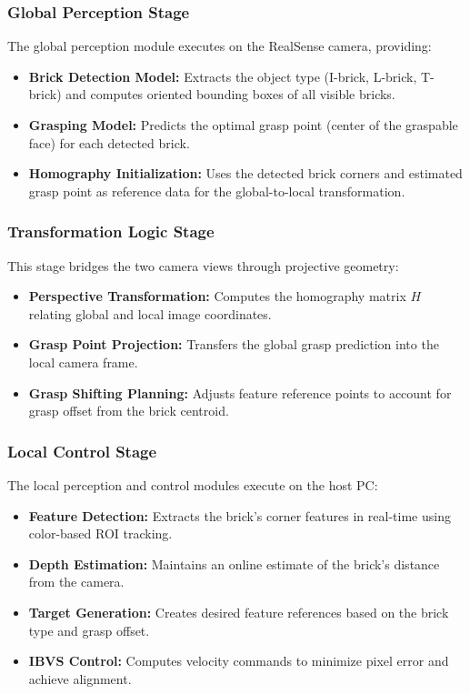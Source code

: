 \subsubsection{Global Perception Stage}
The global perception module executes on the RealSense camera, providing:
\begin{itemize}
    \item \textbf{Brick Detection Model:} Extracts the object type (I-brick, L-brick, T-brick) and computes oriented bounding boxes of all visible bricks.
    \item \textbf{Grasping Model:} Predicts the optimal grasp point (center of the graspable face) for each detected brick.
    \item \textbf{Homography Initialization:} Uses the detected brick corners and estimated grasp point as reference data for the global-to-local transformation.
\end{itemize}

\subsubsection{Transformation Logic Stage}
This stage bridges the two camera views through projective geometry:
\begin{itemize}
    \item \textbf{Perspective Transformation:} Computes the homography matrix $H$ relating global and local image coordinates.
    \item \textbf{Grasp Point Projection:} Transfers the global grasp prediction into the local camera frame.
    \item \textbf{Grasp Shifting Planning:} Adjusts feature reference points to account for grasp offset from the brick centroid.
\end{itemize}

\subsubsection{Local Control Stage}
The local perception and control modules execute on the host PC:
\begin{itemize}
    \item \textbf{Feature Detection:} Extracts the brick's corner features in real-time using color-based ROI tracking.
    \item \textbf{Depth Estimation:} Maintains an online estimate of the brick's distance from the camera.
    \item \textbf{Target Generation:} Creates desired feature references based on the brick type and grasp offset.
    \item \textbf{IBVS Control:} Computes velocity commands to minimize pixel error and achieve alignment.
\end{itemize}

